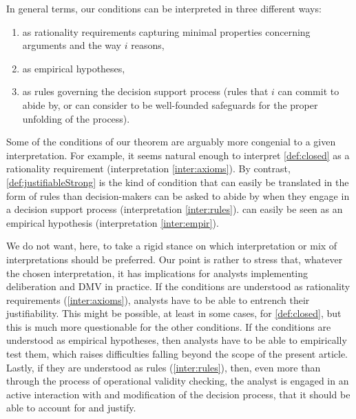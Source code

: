 \documentclass[version=3.21, pagesize, twoside=off, bibliography=totoc, DIV=calc, fontsize=12pt, a4paper, french, english]{scrartcl}
\begin{document}
In general terms, our conditions can be interpreted in three different ways:
\begin{enumerate}[label=\emph{\roman*}, ref=\emph{\roman*}]
	\item \label{inter:axioms} as rationality requirements capturing minimal properties concerning arguments and the way $i$ reasons,
	\item \label{inter:empir} as empirical hypotheses,
	\item \label{inter:rules} as rules governing the decision support process (rules that $i$ can commit to abide by, or can consider to be well-founded safeguards for the proper unfolding of the process).
\end{enumerate}

Some of the conditions of our theorem are arguably more congenial to a given interpretation. For example, it seems natural enough to interpret \cref{def:closed} as a rationality requirement (interpretation \ref{inter:axioms}). 
By contrast, \cref{def:justifiableStrong} is the kind of condition that can easily be translated in the form of rules than decision-makers can be asked to abide by when they engage in a decision support process (interpretation \ref{inter:rules}). 
 can easily be seen as an empirical hypothesis (interpretation \ref{inter:empir}).

We do not want, here, to take a rigid stance on which interpretation or mix of interpretations should be preferred. 
Our point is rather to stress that, whatever the chosen interpretation, it has implications for analysts implementing deliberation and DMV in practice. 
If the conditions are understood as rationality requirements (\ref{inter:axioms}), analysts have to be able to entrench their justifiability. 
This might be possible, at least in some cases, for \cref{def:closed}, but this is much more questionable for the other conditions. 
If the conditions are understood as empirical hypotheses, then analysts have to be able to empirically test them, which raises difficulties falling beyond the scope of the present article.
Lastly, if they are understood as rules (\ref{inter:rules}), then, even more than through the process of operational validity checking, the analyst is engaged in an active interaction with and modification of the decision process, that it should be able to account for and justify.
\end{document}

